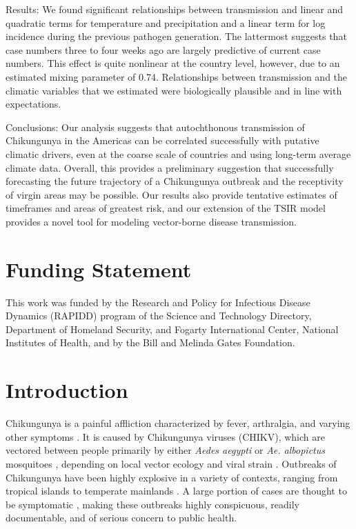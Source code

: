 \documentclass[11pt]{article}
\begin{document}
\noindent Results: We found significant relationships between transmission and linear and quadratic terms for temperature and precipitation and a linear term for log incidence during the previous pathogen generation. The lattermost suggests that case numbers three to four weeks ago are largely predictive of current case numbers. This effect is quite nonlinear at the country level, however, due to an estimated mixing parameter of 0.74. Relationships between transmission and the climatic variables that we estimated were biologically plausible and in line with expectations. 

\noindent Conclusions: Our analysis suggests that autochthonous transmission of Chikungunya in the Americas can be correlated successfully with putative climatic drivers, even at the coarse scale of countries and using long-term average climate data. Overall, this provides a preliminary suggestion that successfully forecasting the future trajectory of a Chikungunya outbreak and the receptivity of virgin areas may be possible. Our results also provide tentative estimates of timeframes and areas of greatest risk, and our extension of the TSIR model provides a novel tool for modeling vector-borne disease transmission.


\section*{Funding Statement}
This work was funded by the Research and Policy for Infectious Disease Dynamics (RAPIDD) program of the Science and Technology Directory, Department of Homeland Security, and Fogarty International Center, National Institutes of Health, and by the Bill and Melinda Gates Foundation.


\section*{Introduction}
Chikungunya is a painful affliction characterized by fever, arthralgia, and varying other symptoms \cite{Powers2007,Staples2009}. It is caused by Chikungunya viruses (CHIKV), which are vectored between people primarily by either \textit{Aedes aegypti} or \textit{Ae. albopictus} mosquitoes \cite{Pialoux2007}, depending on local vector ecology \cite{Powers2007} and viral strain \cite{Tsetsarkin2007}. Outbreaks of Chikungunya have been highly explosive in a variety of contexts, ranging from tropical islands \cite{Josseran2006} to temperate mainlands \cite{Rezza2007}. A large portion of cases are thought to be symptomatic \cite{Staples2009}, making these outbreaks highly conspicuous, readily documentable, and of serious concern to public health.
\end{document}
